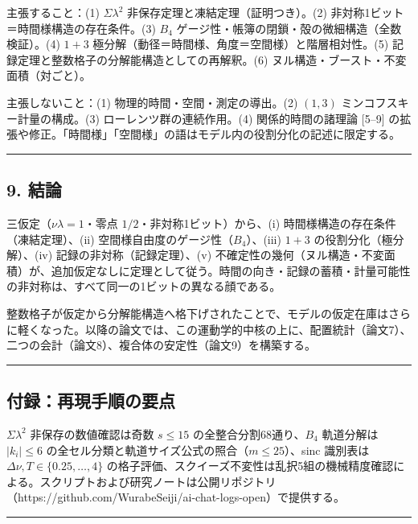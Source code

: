 \documentclass[
]{ltjsarticle}
\begin{document}
主張すること：(1) \(\Sigma\lambda^2\)
非保存定理と凍結定理（証明つき）。(2)
非対称1ビット＝時間様構造の存在条件。(3) \(B_4\)
ゲージ性・帳簿の閉鎖・殻の微細構造（全数検証）。(4) \(1{+}3\)
極分解（動径＝時間様、角度＝空間様）と階層相対性。(5)
記録定理と整数格子の分解能構造としての再解釈。(6)
ヌル構造・ブースト・不変面積（対ごと）。

主張しないこと：(1) 物理的時間・空間・測定の導出。(2) \((1,3)\)
ミンコフスキー計量の構成。(3) ローレンツ群の連続作用。(4)
関係的時間の諸理論 {[}5--9{]}
の拡張や修正。「時間様」「空間様」の語はモデル内の役割分化の記述に限定する。

\begin{center}\rule{0.5\linewidth}{0.5pt}\end{center}

\subsection{9. 結論}\label{ux7d50ux8ad6}

三仮定（\(\nu\lambda=1\)・零点 \(1/2\)・非対称1ビット）から、(i)
時間様構造の存在条件（凍結定理）、(ii)
空間様自由度のゲージ性（\(B_4\)）、(iii) \(1{+}3\)
の役割分化（極分解）、(iv) 記録の非対称（記録定理）、(v)
不確定性の幾何（ヌル構造・不変面積）が、追加仮定なしに定理として従う。時間の向き・記録の蓄積・計量可能性の非対称は、すべて同一の1ビットの異なる顔である。

整数格子が仮定から分解能構造へ格下げされたことで、モデルの仮定在庫はさらに軽くなった。以降の論文では、この運動学的中核の上に、配置統計（論文7）、二つの会計（論文8）、複合体の安定性（論文9）を構築する。

\begin{center}\rule{0.5\linewidth}{0.5pt}\end{center}

\subsection{付録：再現手順の要点}\label{ux4ed8ux9332ux518dux73feux624bux9806ux306eux8981ux70b9}

\(\Sigma\lambda^2\) 非保存の数値確認は奇数 \(s\le15\)
の全整合分割68通り、\(B_4\) 軌道分解は \(|k_i|\le6\)
の全セル分類と軌道サイズ公式の照合（\(m\le25\)）、sinc 識別表は
\(\Delta\nu, T\in\{0.25,\ldots,4\}\)
の格子評価、スクイーズ不変性は乱択5組の機械精度確認による。スクリプトおよび研究ノートは公開リポジトリ（https://github.com/WurabeSeiji/ai-chat-logs-open）で提供する。

\begin{center}\rule{0.5\linewidth}{0.5pt}\end{center}
\end{document}
